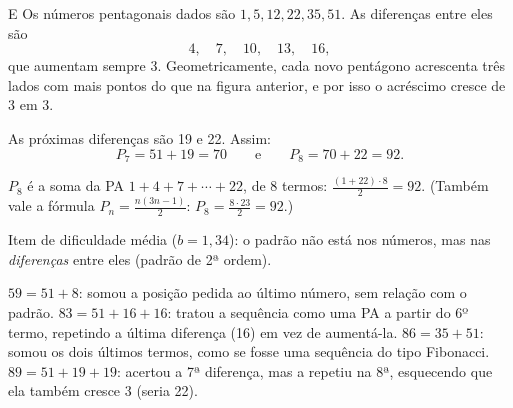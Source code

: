 \begin{resolucao}{E}
 Os números pentagonais dados são
$1, 5, 12, 22, 35, 51$. As diferenças entre eles são
\[
4,\quad 7,\quad 10,\quad 13,\quad 16,
\]
que aumentam sempre 3. Geometricamente, cada novo pentágono acrescenta três
lados com mais pontos do que na figura anterior, e por isso o acréscimo cresce
de 3 em 3.

 As próximas diferenças são 19 e 22. Assim:
\[
P_7 = 51 + 19 = 70 \qquad\text{e}\qquad P_8 = 70 + 22 = 92 .
\]

 $P_8$ é a soma da PA
$1 + 4 + 7 + \cdots + 22$, de 8 termos:
$\frac{(1 + 22)\cdot 8}{2} = 92$. (Também vale a fórmula
$P_n = \frac{n(3n-1)}{2}$: $P_8 = \frac{8\cdot 23}{2} = 92$.)


Item de dificuldade média ($b = 1{,}34$): o padrão não está nos números, mas
nas \emph{diferenças} entre eles (padrão de 2ª ordem).

\begin{distratores}
 $59 = 51 + 8$: somou a posição pedida ao último número, sem relação
com o padrão.
 $83 = 51 + 16 + 16$: tratou a sequência como uma PA a partir do 6º
termo, repetindo a última diferença (16) em vez de aumentá-la.
 $86 = 35 + 51$: somou os dois últimos termos, como se fosse uma
sequência do tipo Fibonacci.
 $89 = 51 + 19 + 19$: acertou a 7ª diferença, mas a repetiu na 8ª,
esquecendo que ela também cresce 3 (seria 22).
\end{distratores}
\end{resolucao}


